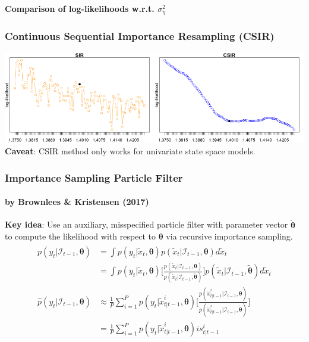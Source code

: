 \documentclass[11pt]{beamer}
\begin{document}
\begin{frame}
\framesubtitle{Comparison of log-likelihoods w.r.t. $\sigma_{\eta}^2$}
\frametitle{Continuous Sequential Importance Resampling (CSIR)}
\centering
\includegraphics[scale=0.30]{ullm-loglik-zoom-2}\\
\bigskip
\textbf{Caveat}: CSIR method only works for univariate state space models. 
\end{frame}

\begin{frame}
\frametitle{Importance Sampling Particle Filter}
\framesubtitle{by Brownlees \& Kristensen (2017)}
\textbf{Key idea}: Use an auxiliary, misspecified particle filter with parameter vector $\boldsymbol{\tilde{\theta}}$ to compute the likelihood with respect to $\boldsymbol{\theta}$ via recursive importance sampling.
\begin{align*} 
\begin{split}
p(y_t | \mathcal{I}_{t-1}, \boldsymbol{\theta}) &= \int p(y_t | \tilde{x}_t, \boldsymbol{\theta}) p(\tilde{x}_t | \mathcal{I}_{t-1}, \boldsymbol{\theta}) d \tilde{x}_t \\
&= \int p(y_t | \tilde{x}_t, \boldsymbol{\theta}) \bigg[ \frac{p(\tilde{x}_t | \mathcal{I}_{t-1}, \boldsymbol{\theta})}{p(\tilde{x}_t | \mathcal{I}_{t-1}, \boldsymbol{\tilde{\theta}})} \bigg] p(\tilde{x}_t | \mathcal{I}_{t-1}, \boldsymbol{\tilde{\theta}}) d \tilde{x}_t \\
\hat{p}(y_t | \mathcal{I}_{t-1}, \boldsymbol{\theta}) &\approx \frac{1}{P} \sum_{i=1}^P p(y_t | \tilde{x}_{t|t-1}^i, \boldsymbol{\theta})  \bigg[ \frac{p(\tilde{x}_{t|t-1}^i | \mathcal{I}_{t-1}, \boldsymbol{\theta})}{p(\tilde{x}_{t|t-1}^i | \mathcal{I}_{t-1}, \boldsymbol{\tilde{\theta}})} \bigg] \\
&= \frac{1}{P} \sum_{i=1}^P p(y_t | \tilde{x}_{t|t-1}^i, \boldsymbol{\theta}) is_{t|t-1}^i \\
\end{split}					
\end{align*}  
\end{frame}
\end{document}
